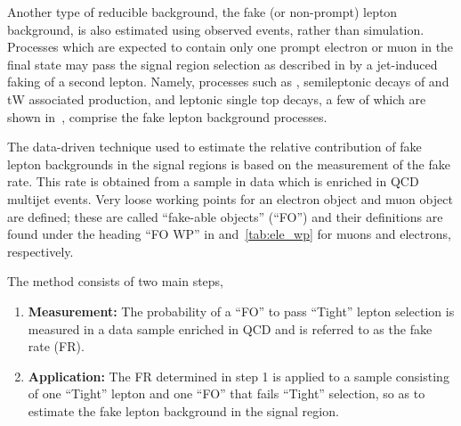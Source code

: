 Another type of reducible background, the fake (or non-prompt) lepton background, is also estimated using observed events, rather than simulation. Processes which are expected to contain only one prompt electron or muon in the final state may pass the signal region selection as described in  by a jet-induced faking of a second lepton. Namely, processes such as \Wjets, semileptonic decays of \ttbar and tW associated production, and leptonic single top decays, a few of which are shown in~, comprise the fake lepton background processes. 

The data-driven technique used to estimate the relative contribution of fake lepton backgrounds in the signal regions is based on the measurement of the fake rate. This rate is obtained from a sample in data which is enriched in QCD multijet events. Very loose working points for an electron object and muon object are defined; these are called ``fake-able objects'' (``FO'') and their definitions are found under the heading ``FO WP'' in  and~\ref{tab:ele_wp} for muons and electrons, respectively.

The method consists of two main steps,
\begin{enumerate}
\item \textbf{Measurement:} The probability of a ``FO'' to pass ``Tight'' lepton selection is measured in a data sample enriched in QCD and is referred to as the fake rate (FR).
\item \textbf{Application:} The FR determined in step 1 is applied to a sample consisting of one ``Tight'' lepton and one ``FO'' that fails ``Tight'' selection, so as to estimate the fake lepton background in the signal region.
\end{enumerate}


